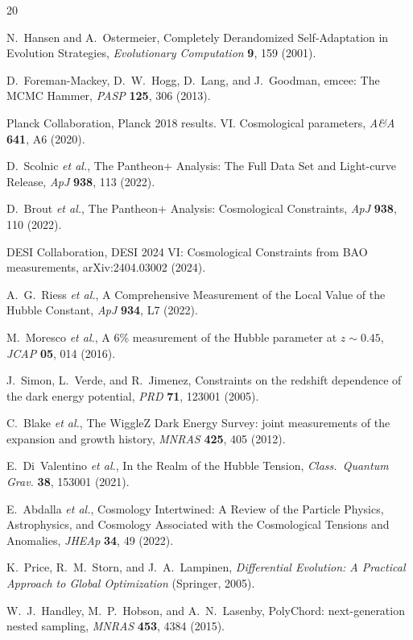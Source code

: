 \documentclass[twocolumn,showpacs,preprintnumbers,amsmath,amssymb,prl]{revtex4-2}
\begin{document}
\begin{thebibliography}{20}

N.~Hansen and A.~Ostermeier, Completely Derandomized Self-Adaptation in Evolution Strategies, \textit{Evolutionary Computation} \textbf{9}, 159 (2001).

D.~Foreman-Mackey, D.~W.~Hogg, D.~Lang, and J.~Goodman, emcee: The MCMC Hammer, \textit{PASP} \textbf{125}, 306 (2013).

Planck Collaboration, Planck 2018 results. VI. Cosmological parameters, \textit{A\&A} \textbf{641}, A6 (2020).

D.~Scolnic \textit{et al.}, The Pantheon+ Analysis: The Full Data Set and Light-curve Release, \textit{ApJ} \textbf{938}, 113 (2022).

D.~Brout \textit{et al.}, The Pantheon+ Analysis: Cosmological Constraints, \textit{ApJ} \textbf{938}, 110 (2022).

DESI Collaboration, DESI 2024 VI: Cosmological Constraints from BAO measurements, arXiv:2404.03002 (2024).

A.~G.~Riess \textit{et al.}, A Comprehensive Measurement of the Local Value of the Hubble Constant, \textit{ApJ} \textbf{934}, L7 (2022).

M.~Moresco \textit{et al.}, A 6\% measurement of the Hubble parameter at $z\sim0.45$, \textit{JCAP} \textbf{05}, 014 (2016).

J.~Simon, L.~Verde, and R.~Jimenez, Constraints on the redshift dependence of the dark energy potential, \textit{PRD} \textbf{71}, 123001 (2005).

C.~Blake \textit{et al.}, The WiggleZ Dark Energy Survey: joint measurements of the expansion and growth history, \textit{MNRAS} \textbf{425}, 405 (2012).

E.~Di~Valentino \textit{et al.}, In the Realm of the Hubble Tension, \textit{Class.\ Quantum Grav.} \textbf{38}, 153001 (2021).

E.~Abdalla \textit{et al.}, Cosmology Intertwined: A Review of the Particle Physics, Astrophysics, and Cosmology Associated with the Cosmological Tensions and Anomalies, \textit{JHEAp} \textbf{34}, 49 (2022).

K.~Price, R.~M.~Storn, and J.~A.~Lampinen, \textit{Differential Evolution: A Practical Approach to Global Optimization} (Springer, 2005).

W.~J.~Handley, M.~P.~Hobson, and A.~N.~Lasenby, PolyChord: next-generation nested sampling, \textit{MNRAS} \textbf{453}, 4384 (2015).

\end{thebibliography}
\end{document}
